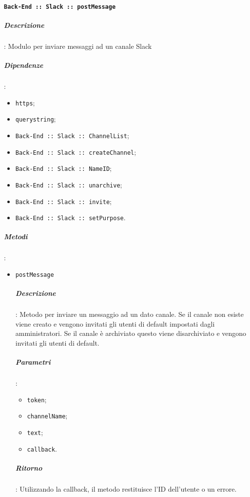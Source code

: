 \documentclass[../DefinizioneDiProdotto_v2.0.0.tex]{subfiles}
\begin{document}
\paragraph{\texttt{Back-End :: Slack :: postMessage}}
\subparagraph{Descrizione}: Modulo per inviare messaggi ad un canale Slack
\subparagraph{Dipendenze}:
\begin{itemize}
	\item \texttt{https};
	\item \texttt{querystring};
	\item \texttt{Back-End :: Slack :: ChannelList};
	\item \texttt{Back-End :: Slack :: createChannel};
	\item \texttt{Back-End :: Slack :: NameID};
	\item \texttt{Back-End :: Slack :: unarchive};
	\item \texttt{Back-End :: Slack :: invite};
	\item \texttt{Back-End :: Slack :: setPurpose}.
\end{itemize}
\subparagraph{Metodi}:
\begin{itemize}
	\item \texttt{postMessage}
	      \subparagraph{Descrizione}: Metodo per inviare un messaggio ad un dato canale. Se il canale non esiste viene creato e vengono invitati gli utenti di default impostati dagli amministratori. Se il canale è archiviato questo viene disarchiviato e vengono invitati gli utenti di default.
	      \subparagraph{Parametri}:
	      \begin{itemize}
	      	\item \texttt{token};
	      	\item \texttt{channelName};
	      	\item \texttt{text};
	      	\item \texttt{callback}.
	      \end{itemize}
	      \subparagraph{Ritorno}: Utilizzando la callback, il metodo restituisce l'ID dell'utente o un errore.
\end{itemize}
\end{document}
